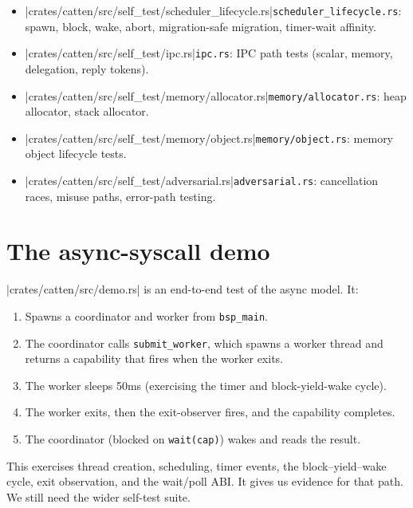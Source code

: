 \begin{itemize}
        the mailbox index demo, and the thread-join probe
        (\autoref{sec:sitas-mailbox-index}).
    \item \repofiletext|crates/catten/src/self_test/scheduler_lifecycle.rs|{\texttt{scheduler\_lifecycle.rs}}: spawn, block, wake, abort,
        migration-safe migration, timer-wait affinity.
    \item \repofiletext|crates/catten/src/self_test/ipc.rs|{\texttt{ipc.rs}}: IPC path tests (scalar, memory, delegation,
        reply tokens).
    \item \repofiletext|crates/catten/src/self_test/memory/allocator.rs|{\texttt{memory/allocator.rs}}: heap allocator, stack allocator.
    \item \repofiletext|crates/catten/src/self_test/memory/object.rs|{\texttt{memory/object.rs}}: memory object lifecycle tests.
    \item \repofiletext|crates/catten/src/self_test/adversarial.rs|{\texttt{adversarial.rs}}: cancellation races, misuse paths,
        error-path testing.
\end{itemize}

\section{The async-syscall demo}

\repofile|crates/catten/src/demo.rs| is an end-to-end test of the
async model. It:

\begin{enumerate}
    \item Spawns a coordinator and worker from \texttt{bsp\_main}.
    \item The coordinator calls \texttt{submit\_worker}, which spawns a worker
        thread and returns a capability that fires when the worker exits.
    \item The worker sleeps 50ms (exercising the timer and block-yield-wake
        cycle).
    \item The worker exits, then the exit-observer fires, and the capability completes.
    \item The coordinator (blocked on \texttt{wait(cap)}) wakes and reads
        the result.
\end{enumerate}

This exercises thread creation, scheduling, timer events, the block--yield--wake
cycle, exit observation, and the wait/poll ABI. It gives us evidence for that
path. We still need the wider self-test suite.

